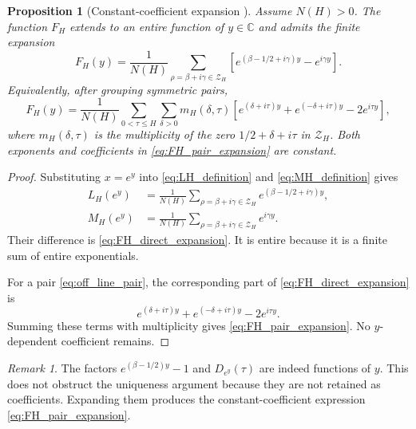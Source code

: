 \documentclass[11pt]{amsart}
\numberwithin{equation}{section}
\theoremstyle{plain}
\newtheorem{proposition}[theorem]{Proposition}
\theoremstyle{definition}
\theoremstyle{remark}
\newtheorem{remark}[theorem]{Remark}
\begin{document}
\begin{proposition}[Constant-coefficient expansion {}]
\label{prop:constant_coefficient_expansion}
Assume $N(H)>0$.
The function $F_H$ extends to an entire function of $y\in\mathbb C$ and admits the finite expansion
\begin{equation}
F_H(y)
=
\frac{1}{N(H)}
\sum_{\rho=\beta+i\gamma\in\mathcal Z_H}
\left[
 e^{(\beta-1/2+i\gamma)y}-e^{i\gamma y}
\right].
\label{eq:FH_direct_expansion}
\end{equation}
Equivalently, after grouping symmetric pairs,
\begin{equation}
F_H(y)
=
\frac{1}{N(H)}
\sum_{0<\tau\leq H}
\sum_{\delta>0}
m_H(\delta,\tau)
\left[
 e^{(\delta+i\tau)y}
+e^{(-\delta+i\tau)y}
-2e^{i\tau y}
\right],
\label{eq:FH_pair_expansion}
\end{equation}
where $m_H(\delta,\tau)$ is the multiplicity of the zero $1/2+\delta+i\tau$ in $\mathcal Z_H$.  Both exponents and coefficients in \eqref{eq:FH_pair_expansion} are constant.
\end{proposition}

\begin{proof}
Substituting $x=e^y$ into \eqref{eq:LH_definition} and \eqref{eq:MH_definition} gives
\begin{align}
L_H(e^y)
&=
\frac{1}{N(H)}
\sum_{\rho=\beta+i\gamma\in\mathcal Z_H}
 e^{(\beta-1/2+i\gamma)y},
\label{eq:LH_y}
\\
M_H(e^y)
&=
\frac{1}{N(H)}
\sum_{\rho=\beta+i\gamma\in\mathcal Z_H}
 e^{i\gamma y}.
\label{eq:MH_y}
\end{align}
Their difference is \eqref{eq:FH_direct_expansion}.  It is entire because it is a finite sum of entire exponentials.

For a pair \eqref{eq:off_line_pair}, the corresponding part of \eqref{eq:FH_direct_expansion} is
\begin{equation}
 e^{(\delta+i\tau)y}
+e^{(-\delta+i\tau)y}
-2e^{i\tau y}.
\label{eq:pair_expanded_y}
\end{equation}
Summing these terms with multiplicity gives \eqref{eq:FH_pair_expansion}.  No $y$-dependent coefficient remains.
\end{proof}

\begin{remark}
\label{rem:constant_coefficient_scope}
The factors $e^{(\beta-1/2)y}-1$ and $D_{e^y}(\tau)$ are indeed functions of $y$.  This does not obstruct the uniqueness argument because they are not retained as coefficients.  Expanding them produces the constant-coefficient expression \eqref{eq:FH_pair_expansion}.
\end{remark}
\end{document}

